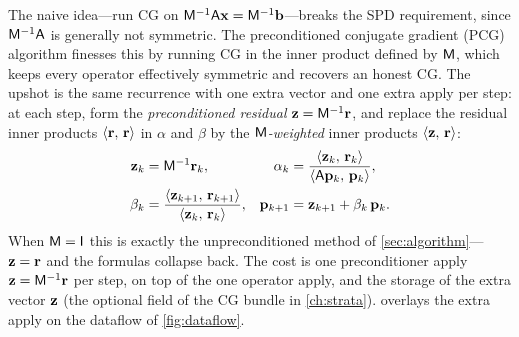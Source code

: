The naive idea---run CG on $\mathsf{M}^{-1}\mathsf{A}\mathbf{x}=\mathsf{M}^{-1}\mathbf{b}$---breaks the
SPD requirement, since $\mathsf{M}^{-1}\mathsf{A}$ is generally not symmetric. The
preconditioned conjugate gradient (PCG) algorithm finesses this by running CG in
the inner product defined by $\mathsf{M}$, which keeps every operator effectively
symmetric and recovers an honest CG. The upshot is the same recurrence with one
extra vector and one extra apply per step: at each step, form the
\emph{preconditioned residual} $\mathbf{z}=\mathsf{M}^{-1}\mathbf{r}$, and replace the residual
inner products $\left\langle \mathbf{r},\, \mathbf{r}\right\rangle$ in $\alpha$ and $\beta$ by the
\emph{$\mathsf{M}$-weighted} inner products $\left\langle \mathbf{z},\, \mathbf{r}\right\rangle$:
\begin{align}
\label{eq:pcg-alpha}
  \mathbf{z}_k &= \mathsf{M}^{-1}\mathbf{r}_k, &
  \alpha_k &= \frac{\left\langle \mathbf{z}_k,\, \mathbf{r}_k\right\rangle}{\left\langle \mathsf{A}\mathbf{p}_k,\, \mathbf{p}_k\right\rangle}, \\
\label{eq:pcg-beta}
  \beta_k &= \frac{\left\langle \mathbf{z}_{k+1},\, \mathbf{r}_{k+1}\right\rangle}{\left\langle \mathbf{z}_k,\, \mathbf{r}_k\right\rangle}, &
  \mathbf{p}_{k+1} &= \mathbf{z}_{k+1} + \beta_k\,\mathbf{p}_k .
\end{align}
When $\mathsf{M}=\mathsf{I}$ this is exactly the unpreconditioned method of
\cref{sec:algorithm}---$\mathbf{z}=\mathbf{r}$ and the formulas collapse back. The cost is one
preconditioner apply $\mathbf{z}=\mathsf{M}^{-1}\mathbf{r}$ per step, on top of the one operator
apply, and the storage of the extra vector $\mathbf{z}$ (the optional  field of
the CG  bundle in \cref{ch:strata}).  overlays the
extra apply on the dataflow of \cref{fig:dataflow}.

